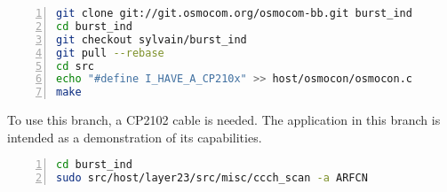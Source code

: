       \begin{lstlisting}[language=bash, numbers=left,
basicstyle=\footnotesize, breaklines=true, frame=single]
git clone git://git.osmocom.org/osmocom-bb.git burst_ind
cd burst_ind
git checkout sylvain/burst_ind
git pull --rebase
cd src
echo "#define I_HAVE_A_CP210x" >> host/osmocon/osmocon.c
make
      \end{lstlisting}

To use this branch, a CP2102 cable is needed. The 
application in this branch is intended as a demonstration of its
capabilities.

      \begin{lstlisting}[language=bash, numbers=left,
basicstyle=\footnotesize, breaklines=true, frame=single]
cd burst_ind
sudo src/host/layer23/src/misc/ccch_scan -a ARFCN
      \end{lstlisting}
